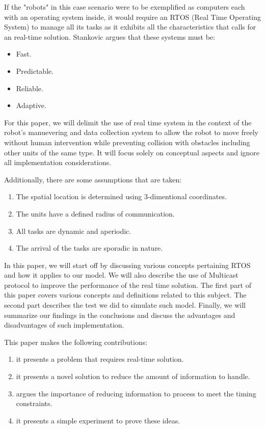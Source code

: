 \documentclass[journal]{IEEEtran}
\begin{document}
If the "robots" in this case scenario were to be exemplified as computers each with an operating system inside, it would require an RTOS (Real Time Operating System) to manage all its tasks as it exhibits all the characteristics that calls for an real-time solution. Stankovic \cite{YS3} argues that these systems must be:

\begin{itemize}
\item Fast.
\item Predictable.
\item Reliable.
\item Adaptive.
\end{itemize}

For this paper, we will delimit the use of real time system in the context of the robot's manuevering and data collection system to allow the robot to move freely without human intervention while preventing collision with obstacles including other units of the same type. It will focus solely on conceptual aspects and ignore all implementation considerations. 

Additionally, there are some assumptions that are taken:

\begin{enumerate}
\item The spatial location is determined using 3-dimentional coordinates.
\item The units have a defined radius of communication.
\item All tasks are dynamic and aperiodic.
\item The arrival of the tasks are sporadic in nature.
\end{enumerate}

In this paper, we will start off by discussing various concepts pertaining RTOS and how it applies to our model. We will also describe the use of Multicast protocol to improve the performance of the real time solution. The first part of this paper covers various concepts and definitions related to this subject. The second part describes the test we did to simulate such model. Finally, we will summarize our findings in the conclusions and discuss the advantages and disadvantages of such implementation.

This paper makes the following contributions:
\begin{enumerate}
\item it presents a problem that requires real-time solution.
\item it presents a novel solution to reduce the amount of information to handle.
\item argues the importance of reducing information to process to meet the timing constraints.
\item it presents a simple experiment to prove these ideas.
\end{enumerate}
\end{document}
